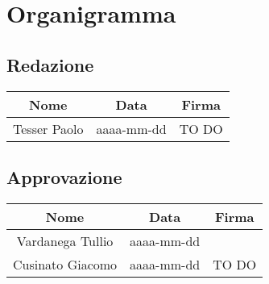 %
%


\section{Organigramma} %
\label{sec:organigramma}
	\subsection{Redazione} %
	\label{sub:redazione}
		\begin{longtable}{c|c|c}
			\label{tab:redazione}
			\textbf{Nome} & \textbf{Data} & \textbf{Firma} \\
			\hline
			Tesser Paolo &
			aaaa-mm-dd &
			TO DO
		\end{longtable}

	\subsection{Approvazione} %
	\label{sub:approvazione}
		\begin{longtable}{c|c|c}
			\label{tab:approvazione}
			\textbf{Nome} & \textbf{Data} & \textbf{Firma} \\
			\hline
			Vardanega Tullio &
			aaaa-mm-dd &
			\\
			\hline
			Cusinato Giacomo &
			aaaa-mm-dd &
			TO DO \\
		\end{longtable}
	
